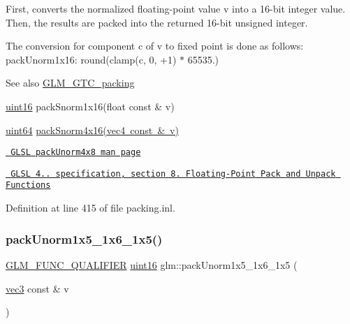 First, converts the normalized floating-\/point value v into a 16-\/bit integer value. Then, the results are packed into the returned 16-\/bit unsigned integer.

The conversion for component c of v to fixed point is done as follows\+: pack\+Unorm1x16\+: round(clamp(c, 0, +1) $\ast$ 65535.)

\begin{DoxySeeAlso}{See also}
\mbox{\hyperlink{group__gtc__packing}{G\+L\+M\+\_\+\+G\+T\+C\+\_\+packing}} 

\mbox{\hyperlink{group__gtc__type__precision_gad8c2939e1fdd8e5828b31d95c52255d5}{uint16}} pack\+Snorm1x16(float const \& v) 

\mbox{\hyperlink{group__gtc__type__precision_gae3632bf9b37da66233d78930dd06378a}{uint64}} \mbox{\hyperlink{group__gtc__packing_ga9b237d7c66b7a71964e6d1f4dc06539f}{pack\+Snorm4x16(vec4 const \& v)}} 

\href{http://www.opengl.org/sdk/docs/manglsl/xhtml/packUnorm4x8.xml}{\texttt{ G\+L\+SL pack\+Unorm4x8 man page}} 

\href{http://www.opengl.org/registry/doc/GLSLangSpec.4.20.8.pdf}{\texttt{ G\+L\+SL 4.. specification, section 8. Floating-\/\+Point Pack and Unpack Functions}} 
\end{DoxySeeAlso}


Definition at line 415 of file packing.\+inl.

\mbox{\label{group__gtc__packing_ga0fcb493167d540aca105d11df5c55503}} 
\subsubsection{\texorpdfstring{packUnorm1x5\_1x6\_1x5()}{packUnorm1x5\_1x6\_1x5()}}
{\footnotesize\ttfamily \mbox{\hyperlink{setup_8hpp_a33fdea6f91c5f834105f7415e2a64407}{G\+L\+M\+\_\+\+F\+U\+N\+C\+\_\+\+Q\+U\+A\+L\+I\+F\+I\+ER}} \mbox{\hyperlink{group__gtc__type__precision_gad8c2939e1fdd8e5828b31d95c52255d5}{uint16}} glm\+::pack\+Unorm1x5\+\_\+1x6\+\_\+1x5 (\begin{DoxyParamCaption}\item[{\mbox{\hyperlink{group__core__types_ga1c47e8b3386109bc992b6c48e91b0be7}{vec3}} const \&}]{v }\end{DoxyParamCaption})}

